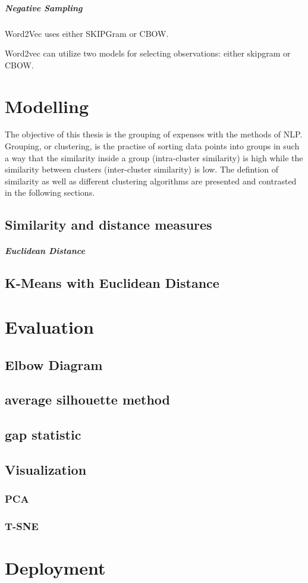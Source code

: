 		\subparagraph{Negative Sampling}
		
		
		Word2Vec uses either SKIPGram or CBOW.
		
		Word2vec can utilize two models for selecting observations: either skipgram or \ac{CBOW}. 
		
	
		
\section{Modelling}
	The objective of this thesis is the grouping of expenses with the methods of \ac{NLP}. Grouping, or clustering, is the practise of sorting data points into groups in such a way that the similarity inside a group (intra-cluster similarity) is high while the similarity between clusters (inter-cluster similarity) is low. The defintion of similarity as well as different clustering algorithms are presented and contrasted in the following sections.
	
	\subsection{Similarity and distance measures}
	\subparagraph{Euclidean Distance} \label{euclidean}
	
	\subsection{K-Means with Euclidean Distance}
\section{Evaluation}
	\subsection{Elbow Diagram}
	\subsection{average silhouette method}
	\subsection{gap statistic}
	\subsection{Visualization}
		\subsubsection{PCA}
		\subsubsection{T-SNE}
\section{Deployment}
